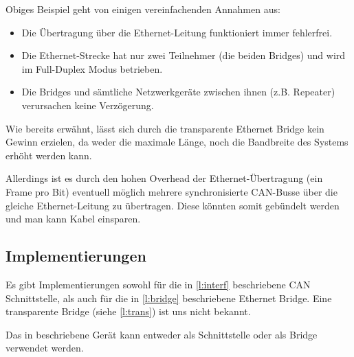 Obiges Beispiel geht von einigen vereinfachenden Annahmen aus:
\begin{itemize}
        \item Die Übertragung über die Ethernet-Leitung funktioniert immer
                fehlerfrei.
        \item Die Ethernet-Strecke hat nur zwei Teilnehmer (die beiden Bridges) und
                wird im Full-Duplex Modus betrieben.
        \item Die Bridges und sämtliche Netzwerkgeräte zwischen ihnen (z.B. Repeater)
                verursachen keine Verzögerung.
\end{itemize}

Wie bereits erwähnt, lässt sich durch die transparente Ethernet Bridge kein Gewinn
erzielen, da weder die maximale Länge, noch die Bandbreite des Systems erhöht werden
kann.

Allerdings ist es durch den hohen Overhead der Ethernet-Übertragung (ein Frame pro
Bit) eventuell möglich mehrere synchronisierte CAN-Busse über die gleiche
Ethernet-Leitung zu übertragen. Diese könnten somit gebündelt werden und man kann
Kabel einsparen.

\subsection{Implementierungen}

Es gibt Implementierungen sowohl für die in \ref{l:interf} beschriebene CAN
Schnittstelle, als auch für die in \ref{l:bridge} beschriebene Ethernet Bridge. Eine
transparente Bridge (siehe \ref{l:trans}) ist uns nicht bekannt.

Das in \citep{STE} beschriebene Gerät kann entweder als Schnittstelle oder als Bridge
verwendet werden.

\newpage {} \listoffigures

\newpage {}
% 


